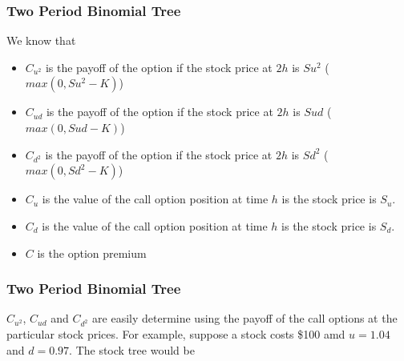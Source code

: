 \documentclass{beamer}
\theoremstyle{plain}
\theoremstyle{definition}
\theoremstyle{remark}
\begin{document}
\begin{frame}
\frametitle{Two Period Binomial Tree}

We know that 
\begin{itemize}
\item $C_{u^2}$ is the payoff of the option if the stock price at $2h$ is $Su^2$ ($max(0,Su^2 - K)$)
\item $C_{ud}$ is the payoff of the option if the stock price at $2h$ is $Sud$ ($max(0,Sud - K)$)
\item $C_{d^2}$ is the payoff of the option if the stock price at $2h$ is $Sd^2$ ($max(0,Sd^2 - K)$)
\item $C_u$ is the value of the call option position at time $h$ is the stock price is $S_u$. 
\item $C_d$ is the value of the call option position at time $h$ is the stock price is $S_d$. 
\item $C$ is the option premium
\end{itemize}

\end{frame}

\begin{frame}
\frametitle{Two Period Binomial Tree}

 $C_{u^2}$, $C_{ud}$ and $C_{d^2}$ are easily determine using the payoff of the call options at the particular stock prices. For example, suppose a stock costs \$100 amd $u = 1.04$ and $d = 0.97$. The stock tree would be 


\end{frame}
\end{document}
